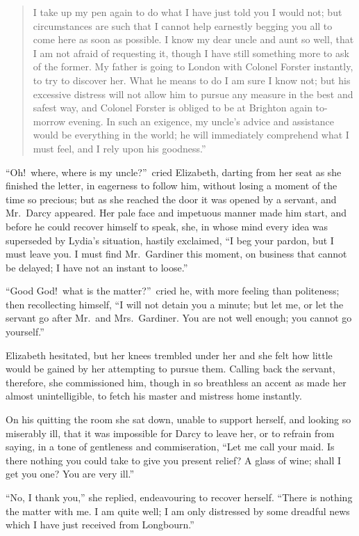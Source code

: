 \documentclass[12pt,english]{book}
\begin{document}
\begin{quotation}{}
I take up my pen again to do what I have just told you I would not;
but circumstances are such that I cannot help earnestly begging you
all to come here as soon as possible. I know my dear uncle and aunt
so well, that I am not afraid of requesting it, though I have still
something more to ask of the former. My father is going to London
with Colonel Forster instantly, to try to discover her. What he means
to do I am sure I know not; but his excessive distress will not allow
him to pursue any measure in the best and safest way, and Colonel
Forster is obliged to be at Brighton again to-morrow evening. In such
an exigence, my uncle's advice and assistance would be everything
in the world; he will immediately comprehend what I must feel, and
I rely upon his goodness.''\end{quotation}

{}``Oh!\ where, where is my uncle?''\ cried Elizabeth, darting
from her seat as she finished the letter, in eagerness to follow him,
without losing a moment of the time so precious; but as she reached
the door it was opened by a servant, and Mr.\ Darcy appeared. Her
pale face and impetuous manner made him start, and before he could
recover himself to speak, she, in whose mind every idea was superseded
by Lydia's situation, hastily exclaimed, {}``I beg your pardon, but
I must leave you. I must find Mr.\ Gardiner this moment, on business
that cannot be delayed; I have not an instant to loose.''

{}``Good God!\ what is the matter?''\ cried he, with more feeling
than politeness; then recollecting himself, {}``I will not detain
you a minute; but let me, or let the servant go after Mr.\ and Mrs.\ 
Gardiner. You are not well enough; you cannot go yourself.''

Elizabeth hesitated, but her knees trembled under her and she felt
how little would be gained by her attempting to pursue them. Calling
back the servant, therefore, she commissioned him, though in so breathless
an accent as made her almost unintelligible, to fetch his master and
mistress home instantly.

On his quitting the room she sat down, unable to support herself,
and looking so miserably ill, that it was impossible for Darcy to
leave her, or to refrain from saying, in a tone of gentleness and
commiseration, {}``Let me call your maid. Is there nothing you could
take to give you present relief? A glass of wine; shall I get you
one? You are very ill.''

{}``No, I thank you,'' she replied, endeavouring to recover herself.
{}``There is nothing the matter with me. I am quite well; I am only
distressed by some dreadful news which I have just received from Longbourn.''
\end{document}

